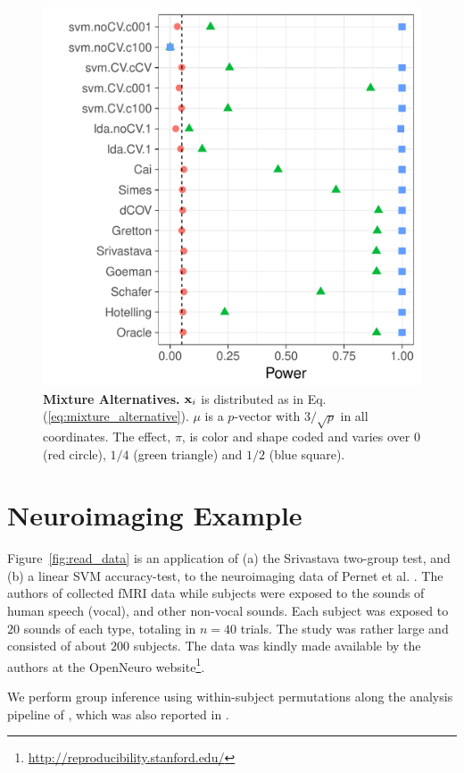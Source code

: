 \documentclass[]{bio}
\begin{document}
\begin{figure}[ht]
	\centering
	\includegraphics[width=0.7\columnwidth]{"art/file12"}
	\caption{\textbf{Mixture Alternatives.} $\mathbf{x}_i$ is distributed as in Eq.(\ref{eq:mixture_alternative}). 
		$\mu$ is a $p$-vector with $3/\sqrt{p}$ in all coordinates.
		The effect, $\pi$, is color and shape coded and varies over $0$ (red circle), $1/4$ (green triangle) and $1/2$ (blue square). }
	\label{fig:file12}
\end{figure}







\section{Neuroimaging Example}
\label{sec:example}

Figure~\ref{fig:read_data} is an application of (a) the Srivastava two-group test, and (b) a linear SVM accuracy-test, to the neuroimaging data of Pernet et al. \cite{pernet_human_2015}. 
The authors of \cite{pernet_human_2015} collected fMRI data while subjects were exposed to the sounds of human speech (vocal), and other non-vocal sounds. 
Each subject was exposed to $20$ sounds of each type, totaling in $n=40$ trials.
The study was rather large and consisted of about $200$ subjects.
The data was kindly made available by the authors at the OpenNeuro website\footnote{\url{http://reproducibility.stanford.edu/}}.

We perform group inference using within-subject permutations along the analysis pipeline of \cite{stelzer_statistical_2013}, which was also reported in \cite{gilron_quantifying_2016}. 
\end{document}

